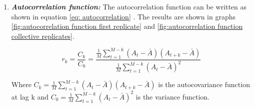 \begin{enumerate}
    \item \textit{\textbf{Autocorrelation function:}} The autocorrelation function can be written as shown in equation \ref{eq: autocorrelation}
    \cite{sumaElectricFieldDrivenTrappingPolyelectrolytes2018}
    . The results are shown in graphs \ref{fig:autocorrelation function first replicate} and \ref{fig:autocorrelation function collective replicates}. 
    
    \begin{equation} \label{eq: autocorrelation}
      r_k = \frac{C_k}{C_0} = \frac{\frac{1}{M} \sum_{t = 1}^{M - k}{(A_t - \bar{A})(A_{t+k} - \bar{A})}}{\frac{1}{M} \sum_{t = 1}^{M - k}{(A_t - \bar{A})^2}}
    \end{equation}

    Where $C_k = \frac{1}{M} \sum_{t = 1}^{M - k}{(A_t - \bar{A})(A_{t+k} - \bar{A})}$ is the autocovariance function at lag k and $C_0 = \frac{1}{M} \sum_{t = 1}^{M - k}{(A_t - \bar{A})^2}$ is the variance function.
    
\end{enumerate}

